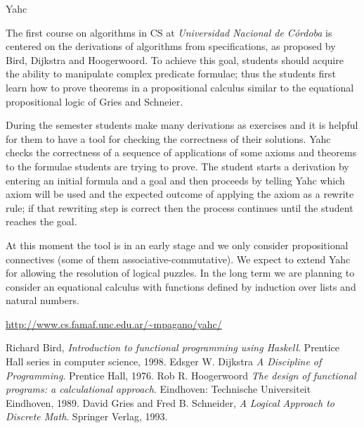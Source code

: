 \documentclass{scrreprt}
\begin{document}
\begin{hcarentry}{Yahc}
\makeheader


The first course on algorithms in CS at {\it Universidad Nacional de
  C\'ordoba} is centered on the derivations of algorithms from
specifications, as proposed by Bird\cite{bird},
Dijkstra\cite{dijkstra} and Hoogerwoord\cite{hoo}. To achieve this
goal, students should acquire the ability to manipulate complex
predicate formulae; thus the students first learn how to prove
theorems in a propositional calculus similar to the equational
propositional logic of Gries and Schneier\cite{gries}.

During the semester students make many derivations as exercises and it
is helpful for them to have a tool for checking the correctness of
their solutions. Yahc checks the correctness of a sequence of
applications of some axioms and theorems to the formulae students are
trying to prove. The student starts a derivation by entering an
initial formula and a goal and then proceeds by telling Yahc which
axiom will be used and the expected outcome of applying the axiom as a
rewrite rule; if that rewriting step is correct then the process
continues until the student reaches the goal.

At this moment the tool is in an early stage and we only consider
propositional connectives (some of them associative-commutative).  We
expect to extend Yahc for allowing the resolution of logical puzzles.
In the long term we are planning to consider an equational calculus
with functions defined by induction over lists and natural numbers.

\FurtherReading
  \url{http://www.cs.famaf.unc.edu.ar/~mpagano/yahc/}
\end{hcarentry}

\begin{thebibliography}{99}
 Richard Bird, {\it Introduction to functional
    programming using Haskell}.  Prentice Hall series in computer
  science, 1998.
 Edsger W. Dijkstra {\it A Discipline of
    Programming}.  Prentice Hall, 1976.
 Rob R. Hoogerwoord {\it The design of functional
    programs: a calculational approach}. Eindhoven: Technische
  Universiteit Eindhoven, 1989.
 David Gries and Fred B. Schneider, {\it A Logical
    Approach to Discrete Math}. Springer Verlag, 1993.
\end{thebibliography}
\end{document}
